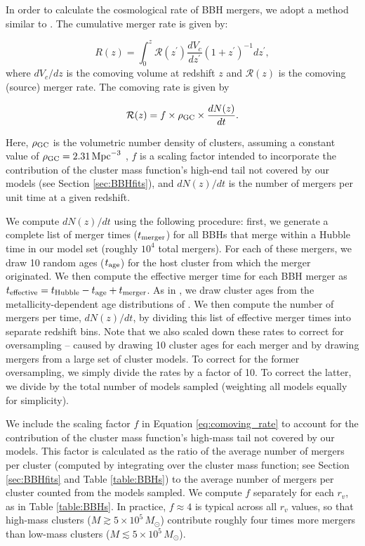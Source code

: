 \documentclass[twocolumn,tighten]{aastex63}
\begin{document}
In order to calculate the cosmological rate of BBH mergers, we adopt a method similar to \citet{Rodriguez2015a}. The cumulative merger rate is given by:

\begin{equation}
    R(z) = \int_0^z \mathcal{R}(z^\prime) \frac{dV_c}{dz^\prime}(1+z^\prime)^{-1}dz^\prime,
\end{equation}
where $dV_c/dz$ is the comoving volume at redshift $z$ and $\mathcal{R}(z)$ is the comoving (source) merger rate. The comoving rate is given by

\begin{equation}
\label{eq:comoving_rate}
\mathcal{R}(z) = f \times \rho_{\rm{GC}} \times \frac{dN(z)}{dt}.
\end{equation}

Here, $\rho_{\rm{GC}}$ is the volumetric number density of clusters, assuming a constant value of $\rho_{\rm{GC}}=2.31\,\rm{Mpc}^{-3}$ \citep[consistent with][]{Rodriguez2015a,RodriguezLoeb2018}, $f$ is a scaling factor intended to incorporate the contribution of the cluster mass function's high-end tail not covered by our models (see Section \ref{sec:BBHfits}), and $dN(z)/dt$ is the number of mergers per unit time at a given redshift.

We compute $dN(z)/dt$ using the following procedure: first, we generate a complete list of merger times ($t_{\rm{merger}}$) for all BBHs that merge within a Hubble time in our model set (roughly $10^4$ total mergers). For each of these mergers, we draw 10 random ages ($t_{\rm{age}}$) for the host cluster from which the merger originated. We then compute the effective merger time for each BBH merger as $t_{\rm{effective}} = t_{\rm{Hubble}} - t_{\rm{age}} + t_{\rm{merger}}$. As in \citet{Rodriguez2018}, we draw cluster ages from the metallicity-dependent age distributions of \citet{El-Badry2018}. We then compute the number of mergers per time, $dN(z)/dt$, by dividing this list of effective merger times into separate redshift bins. Note that we also scaled down these rates to correct for oversampling -- caused by drawing 10 cluster ages for each merger and by drawing mergers from a large set of cluster models. To correct for the former oversampling, we simply divide the rates by a factor of 10. To correct the latter, we divide by the total number of models sampled (weighting all models equally for simplicity).

We include the scaling factor $f$ in Equation \ref{eq:comoving_rate} to account for the contribution of the cluster mass function's high-mass tail not covered by our models. This factor is calculated as the ratio of the average number of mergers per cluster (computed by integrating over the cluster mass function; see Section \ref{sec:BBHfits} and Table \ref{table:BBHs}) to the average number of mergers per cluster counted from the models sampled. We compute $f$ separately for each $r_v$, as in Table \ref{table:BBHs}. In practice, $f \approx 4$ is typical across all $r_v$ values, so that high-mass clusters ($M \gtrsim 5\times10^5\,M_{\odot}$) contribute roughly four times more mergers than low-mass clusters ($M \lesssim 5\times10^5\,M_{\odot}$).
\end{document}
